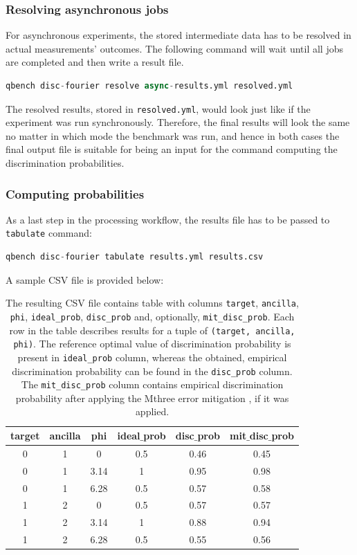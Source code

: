 \documentclass[preprint,12pt, a4paper, dvipsnames]{elsarticle}
\newcommand{\1}{{\rm 1\hspace{-0.9mm}l}}
\theoremstyle{definition}
\begin{document}
\subsubsection{Resolving asynchronous jobs}
For asynchronous experiments, the stored intermediate data has to be resolved in actual
measurements' outcomes. The following command will wait until all jobs are completed and then write
a result file.
\begin{lstlisting}[language=Python]
qbench disc-fourier resolve async-results.yml resolved.yml
\end{lstlisting}
The resolved results, stored in \texttt{resolved.yml}, would look just like if the experiment was
run synchronously. Therefore, the final results will look the same no matter in which mode the
benchmark was run, and hence in both cases the final output file is suitable for being an input for
the command computing the discrimination probabilities.

\subsubsection{Computing probabilities}
As a last step in the processing workflow, the results file has to be passed to \texttt{tabulate}
command:
\begin{lstlisting}[language=Python]
qbench disc-fourier tabulate results.yml results.csv
\end{lstlisting}
A sample CSV file is provided below:
\begin{table}[ht!]
\begin{center}
	\begin{tabular}{|c c c c c c|} 
		\hline
		target & ancilla & phi & ideal$\_$prob  & disc$\_$prob & mit$\_$disc$\_$prob \\ [0.5ex] 
		\hline\hline
		0 & 1 & 0 & 0.5 & 0.46 & 0.45  \\ 
		\hline
		0 & 1 & 3.14 & 1 & 0.95 & 0.98  \\
		\hline
		0 & 1 & 6.28 & 0.5 & 0.57 & 0.58  \\
		\hline
		1 & 2 & 0 & 0.5  & 0.57 & 0.57 \\
		\hline
		1 & 2 & 3.14 & 1 & 0.88 & 0.94  \\ 
		\hline
		1 & 2 & 6.28 & 0.5 & 0.55 & 0.56  \\ 
		\hline
	\end{tabular}
\caption{The resulting CSV file contains table with columns \texttt{target}, \texttt{ancilla}, \texttt{phi},
	\texttt{ideal\_prob}, \texttt{disc\_prob} and, optionally, \texttt{mit\_disc\_prob}. Each row in the
	table describes results for a tuple of \texttt{(target, ancilla, phi)}.  The reference optimal value
	of discrimination probability is present in \texttt{ideal\_prob} column, whereas the obtained,
	empirical discrimination probability can be found in the \texttt{disc\_prob} column. The
	\texttt{mit\_disc\_prob} column contains empirical discrimination probability after applying the
	Mthree error mitigation \cite{mthree, mthreepublication}, if it was applied.}
\label{fig:tabulateresults}
\end{center}
\end{table}
\end{document}
